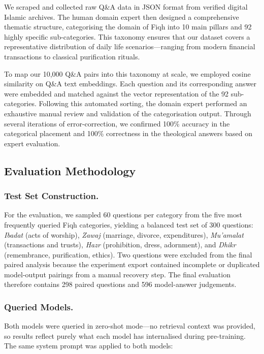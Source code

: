 \documentclass[runningheads]{llncs}
\begin{document}
We scraped and collected raw Q\&A data in JSON format from verified digital Islamic archives. The human domain expert then designed a comprehensive thematic structure, categorising the domain of Fiqh into 10 main pillars and 92 highly specific sub-categories. This taxonomy ensures that our dataset covers a representative distribution of daily life scenarios---ranging from modern financial transactions to classical purification rituals.

To map our 10{,}000 Q\&A pairs into this taxonomy at scale, we employed cosine similarity on Q\&A text embeddings. Each question and its corresponding answer were embedded and matched against the vector representation of the 92 sub-categories. Following this automated sorting, the domain expert performed an exhaustive manual review and validation of the categorisation output. Through several iterations of error-correction, we confirmed 100\% accuracy in the categorical placement and 100\% correctness in the theological answers based on expert evaluation.

\subsection{Evaluation Methodology}

\subsubsection{Test Set Construction.}
For the evaluation, we sampled 60 questions per category from the five most frequently queried Fiqh categories, yielding a balanced test set of 300 questions:
\textit{Ibadat} (acts of worship), \textit{Zawaj} (marriage, divorce, expenditures), \textit{Mu'amalat} (transactions and trusts), \textit{Hazr} (prohibition, dress, adornment), and \textit{Dhikr} (remembrance, purification, ethics).
Two questions were excluded from the final paired analysis because the experiment export contained incomplete or duplicated model-output pairings from a manual recovery step. The final evaluation therefore contains 298 paired questions and 596 model-answer judgements.

\subsubsection{Queried Models.}
Both models were queried in zero-shot mode---no retrieval context was provided, so results reflect purely what each model has internalised during pre-training. The same system prompt was applied to both models:
\end{document}
